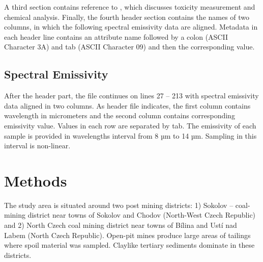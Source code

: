 A third section contains reference to \cite{FK05}, which discusses toxicity measurement and chemical analysis. Finally, the fourth header section contains the names of two columns, in which the following spectral emissivity data are aligned. Metadata in each header line contains an attribute name followed by a colon (ASCII Character 3A) and tab (ASCII Character 09) and then the corresponding value.

\subsection{Spectral Emissivity}

After the header part, the file continues on lines 27 – 213 with spectral emissivity data aligned in two columns. As header file indicates, the first column contains wavelength in micrometers and the second column contains corresponding emissivity value. Values in each row are separated by tab. The emissivity of each sample is provided in wavelengths interval from 8 µm to 14 µm. Sampling in this interval is non-linear.


\section{Methods}

The study area is situated around two post mining districts: 1) Sokolov – coal-mining district near towns of Sokolov and Chodov (North-West Czech Republic) and 2) North Czech coal mining district near towns of Bílina and Ustí nad Labem (North Czech Republic). Open-pit mines produce large areas of tailings where spoil material was sampled. Claylike tertiary sediments dominate in these districts.

